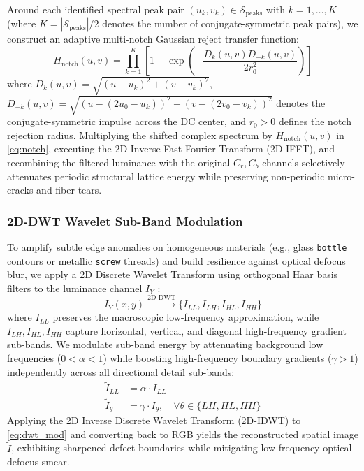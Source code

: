 Around each identified spectral peak pair $(u_k, v_k) \in \mathcal{S}_{\text{peaks}}$ with $k = 1, \dots, K$ (where $K = |\mathcal{S}_{\text{peaks}}| / 2$ denotes the number of conjugate-symmetric peak pairs), we construct an adaptive multi-notch Gaussian reject transfer function:
\begin{equation}
\label{eq:notch}
H_{\text{notch}}(u, v) = \prod_{k=1}^K \left[ 1 - \exp\left( -\frac{D_k(u, v) D_{-k}(u, v)}{2 r_0^2} \right) \right]
\end{equation}
where $D_k(u, v) = \sqrt{(u - u_k)^2 + (v - v_k)^2}$, $D_{-k}(u, v) = \sqrt{(u - (2u_0 - u_k))^2 + (v - (2v_0 - v_k))^2}$ denotes the conjugate-symmetric impulse across the DC center, and $r_0 > 0$ defines the notch rejection radius. Multiplying the shifted complex spectrum by $H_{\text{notch}}(u, v)$ in \eqref{eq:notch}, executing the 2D Inverse Fast Fourier Transform (2D-IFFT), and recombining the filtered luminance with the original $C_r, C_b$ channels selectively attenuates periodic structural lattice energy while preserving non-periodic micro-cracks and fiber tears.

\subsubsection{2D-DWT Wavelet Sub-Band Modulation}
To amplify subtle edge anomalies on homogeneous materials (e.g., glass \texttt{bottle} contours or metallic \texttt{screw} threads) and build resilience against optical defocus blur, we apply a 2D Discrete Wavelet Transform using orthogonal Haar basis filters to the luminance channel $I_Y$ \cite{mallat2008wavelet}:
\begin{equation}
I_Y(x, y) \xrightarrow{\text{2D-DWT}} \{I_{LL}, I_{LH}, I_{HL}, I_{HH}\}
\end{equation}
where $I_{LL}$ preserves the macroscopic low-frequency approximation, while $I_{LH}, I_{HL}, I_{HH}$ capture horizontal, vertical, and diagonal high-frequency gradient sub-bands. We modulate sub-band energy by attenuating background low frequencies ($0 < \alpha < 1$) while boosting high-frequency boundary gradients ($\gamma > 1$) independently across all directional detail sub-bands:
\begin{align}
\tilde{I}_{LL} &= \alpha \cdot I_{LL} \\
\tilde{I}_{\theta} &= \gamma \cdot I_{\theta}, \quad \forall \theta \in \{LH, HL, HH\} \label{eq:dwt_mod}
\end{align}
Applying the 2D Inverse Discrete Wavelet Transform (2D-IDWT) to \eqref{eq:dwt_mod} and converting back to RGB yields the reconstructed spatial image $\tilde{I}$, exhibiting sharpened defect boundaries while mitigating low-frequency optical defocus smear.

